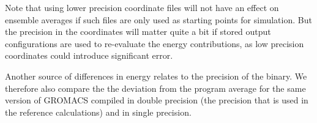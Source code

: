 
Note that using lower precision coordinate files will not have an
effect on ensemble averages if such files are only used as starting
points for simulation. But the precision in the coordinates will
matter quite a bit if stored output configurations are used to
re-evaluate the energy contributions, as low precision coordinates could introduce
significant error.


Another source of differences in energy relates to the precision of
the binary.  We therefore also compare the the deviation from the
program average for the same version of GROMACS compiled in double
precision (the precision that is used in the reference calculations)
and in single precision.


